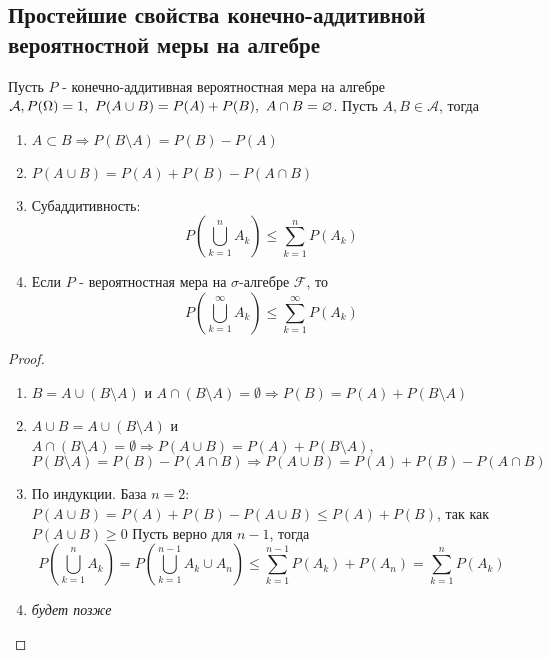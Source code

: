 \documentclass[a4paper, 12pt]{article}
\begin{document}
\subsection{Простейшие свойства конечно-аддитивной вероятностной меры на алгебре}
\begin{theorem}
    Пусть $P$ - конечно-аддитивная вероятностная мера на алгебре $\mathcal{A},\\ P(\Omega)=1,\ P(A\cup B)=P(A)+P(B),\ A\cap B=\emptyset$. Пусть $A,B\in \mathcal{A}$, тогда
    \begin{enumerate}
        \item $A\subset B \Rightarrow P(B\setminus A)=P(B)-P(A)$
        \item $P(A\cup B)=P(A)+P(B)-P(A\cap B)$
        \item Субаддитивность:
        \[P\left(\bigcup\limits_{k=1}^n A_k\right) \leq \sum\limits_{k=1}^{n}P(A_k)\]
        \item Если $P$ - вероятностная мера на $\sigma$-алгебре $\mathcal{F}$, то 
        \[P\left(\bigcup\limits_{k=1}^{\infty}A_k\right)\leq \sum\limits_{k=1}^{\infty}P(A_k)\]
    \end{enumerate}
\end{theorem}
\begin{proof}\tab
    \begin{enumerate}
        \item $B=A\cup(B\setminus A)$ и $A\cap (B\setminus A)=\emptyset \Rightarrow P(B)=P(A)+P(B\setminus A)$
        \item $A\cup B=A\cup (B\setminus A)$ и $A\cap (B\setminus A)=\emptyset \Rightarrow P(A\cup B)=P(A)+P(B\setminus A)$,\\
        $P(B\setminus A)=P(B)-P(A\cap B) \Rightarrow P(A\cup B)=P(A)+P(B)-P(A\cap B)$
        \item По индукции. База $n=2$:\\
        $P(A\cup B)=P(A)+P(B)-P(A\cup B) \leq P(A)+P(B)$, так как $P(A\cup B)\geq 0$
        Пусть верно для $n-1$, тогда\\
        \[P\left(\bigcup\limits_{k=1}^n A_k\right)=P\left(\bigcup\limits_{k=1}^{n-1} A_k \cup A_n\right) \leq \sum\limits_{k=1}^{n-1}P(A_k)+P(A_n)=\sum\limits_{k=1}^{n}P(A_k)\]
        \item \textit{будет позже}
    \end{enumerate}
\end{proof}
\end{document}
